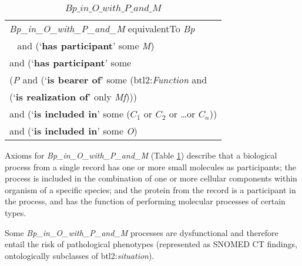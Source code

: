 \begin{table}[H]
	\caption{$Bp\_in\_O\_with\_P\_and\_M$}
	\label{table:BpComposite}
	\centering
	\begin{tabular}{p{3in}}
		\hline
		 \textit{Bp\_in\_O\_with\_P\_and\_M} equivalentTo \textit{Bp}\\\
		\hspace{0.5cm} and (`\textbf{has participant}' some \textit{M})\\
		\hspace{0.5cm} and (`\textbf{has participant}' some \\
		\hspace{1cm}(\textit{P} and (`\textbf{is bearer of}' some (btl2:\textit{Function} and \\
			\hspace{1.5cm} (`\textbf{is realization of}' only \textit{Mf}))) \\
			\hspace{0.5cm} and (`\textbf{is included in}' some ($C_1$ or $C_2$ or \ldots or $C_n$)) \\
			\hspace{0.5cm} and (`\textbf{is included in}' some \textit{O}) \\
\hline
	\end{tabular}
\end{table}
\noindent
Axioms for \textit{Bp\_in\_O\_with\_P\_and\_M} (Table \ref{table:BpComposite}) describe that a biological process from a single record has one or more small molecules as participants; the process is included in the combination of one or more cellular components within organism of a specific species; and the protein from the record is a participant in the process, and has the function of performing molecular processes of certain types.

Some \textit{Bp\_in\_O\_with\_P\_and\_M} processes are dysfunctional and therefore entail the risk of pathological phenotypes (represented as SNOMED CT findings, ontologically subclasses of btl2:\textit{situation}).

